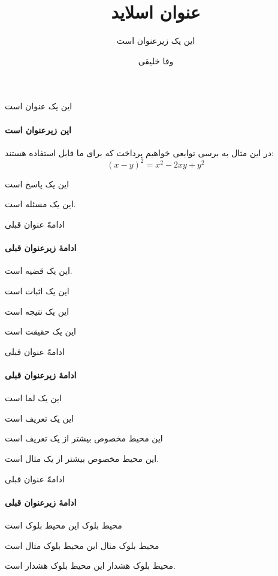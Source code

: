 \documentclass{beamer}
\title{عنوان اسلاید}
\subtitle{این یک زیرعنوان است}
\author{وفا خلیقی}
\institute{دانشگاه تهران}
\begin{document}
\begin{frame}
\titlepage
\end{frame}


\begin{frame}{این یک عنوان است}
\framesubtitle{این زیرعنوان است}
\begin{مثال}
در این مثال به برسی توابعی خواهیم پرداخت که برای ما قابل استفاده هستند:
\begin{equation}
(x-y)^2=x^2-2xy+y^2
\end{equation}
\end{مثال}
\begin{پاسخ}
این یک پاسخ است
\end{پاسخ}
\begin{مسئله}
این یک مسئله است.
\end{مسئله}
\end{frame}
\begin{frame}{ادامهّ عنوان قبلی}
\framesubtitle{ادامهٔ زیرعنوان قبلی}
\begin{قضیه}
این یک قضیه است.
\end{قضیه}
\begin{اثبات}
این یک اثبات است
\end{اثبات}
\begin{نتیجه}
این یک نتیجه است
\end{نتیجه}
\begin{حقیقت}
این یک حقیقت است
\end{حقیقت}
\end{frame}
\begin{frame}{ادامهّ عنوان قبلی}
\framesubtitle{ادامهٔ زیرعنوان قبلی}
\begin{لما}
این یک لما است
\end{لما}
\begin{تعریف}
این یک تعریف است
\end{تعریف}
\begin{تعریفها}
این محیط مخصوص بیشتر از یک تعریف است
\end{تعریفها}
\begin{مثالها}
این محیط مخصوص بیشتر از یک مثال است.
\end{مثالها}
\end{frame}
\begin{frame}{ادامهّ عنوان قبلی}
\framesubtitle{ادامهٔ زیرعنوان قبلی}
\begin{بلوک}{محیط بلوک}
این محیط بلوک است
\end{بلوک}
\begin{بلوک‌مثال}{محیط بلوک مثال}
این محیط بلوک مثال است
\end{بلوک‌مثال}
\begin{بلوک‌هشدار}{محیط بلوک هشدار}
این محیط بلوک هشدار است.
\end{بلوک‌هشدار}
\end{frame}
\end{document}

